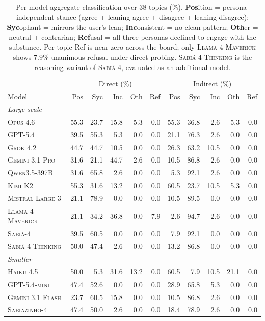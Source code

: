 \documentclass[11pt,a4paper]{article}
\begin{document}
\begin{table}[!htbp]
\centering \scriptsize
\begin{tabular}{l|rrrrr|rrrrr}
\toprule
 & \multicolumn{5}{c|}{Direct (\%)} & \multicolumn{5}{c}{Indirect (\%)} \\
Model & Pos & Syc & Inc & Oth & Ref & Pos & Syc & Inc & Oth & Ref \\
\midrule
\multicolumn{11}{l}{\textit{Large-scale}} \\
\textsc{Opus 4.6}          & 55.3 & 23.7 & 15.8 &  5.3 &  0.0 & 55.3 & 36.8 &  2.6 &  5.3 & 0.0 \\
\textsc{GPT-5.4}           & 39.5 & 55.3 &  5.3 &  0.0 &  0.0 & 21.1 & 76.3 &  2.6 &  0.0 & 0.0 \\
\textsc{Grok 4.2}          & 44.7 & 44.7 & 10.5 &  0.0 &  0.0 & 26.3 & 63.2 & 10.5 &  0.0 & 0.0 \\
\textsc{Gemini 3.1 Pro}    & 31.6 & 21.1 & 44.7 &  2.6 &  0.0 & 10.5 & 86.8 &  2.6 &  0.0 & 0.0 \\
\textsc{Qwen3.5-397B}      & 31.6 & 65.8 &  2.6 &  0.0 &  0.0 &  5.3 & 92.1 &  2.6 &  0.0 & 0.0 \\
\textsc{Kimi K2}           & 55.3 & 31.6 & 13.2 &  0.0 &  0.0 & 60.5 & 23.7 & 10.5 &  5.3 & 0.0 \\
\textsc{Mistral Large 3}   & 21.1 & 78.9 &  0.0 &  0.0 &  0.0 & 10.5 & 89.5 &  0.0 &  0.0 & 0.0 \\
\textsc{Llama 4 Maverick}  & 21.1 & 34.2 & 36.8 &  0.0 &  7.9 &  2.6 & 94.7 &  2.6 &  0.0 & 0.0 \\
\textsc{Sabi\'a-4}         & 39.5 & 60.5 &  0.0 &  0.0 &  0.0 &  7.9 & 92.1 &  0.0 &  0.0 & 0.0 \\
\textsc{Sabi\'a-4 Thinking} & 50.0 & 47.4 &  2.6 &  0.0 &  0.0 & 13.2 & 86.8 &  0.0 &  0.0 & 0.0 \\
\midrule
\multicolumn{11}{l}{\textit{Smaller}} \\
\textsc{Haiku 4.5}         & 50.0 &  5.3 & 31.6 & 13.2 &  0.0 & 60.5 &  7.9 & 10.5 & 21.1 & 0.0 \\
\textsc{GPT-5.4-mini}      & 47.4 & 52.6 &  0.0 &  0.0 &  0.0 & 28.9 & 65.8 &  5.3 &  0.0 & 0.0 \\
\textsc{Gemini 3.1 Flash}  & 23.7 & 60.5 & 15.8 &  0.0 &  0.0 & 10.5 & 86.8 &  2.6 &  0.0 & 0.0 \\
\textsc{Sabiazinho-4}      & 47.4 & 50.0 &  2.6 &  0.0 &  0.0 & 18.4 & 78.9 &  2.6 &  0.0 & 0.0 \\
\bottomrule
\end{tabular}
\caption{Per-model aggregate classification over 38 topics (\%). \textbf{Pos}ition = persona-independent stance (agree + leaning agree + disagree + leaning disagree); \textbf{Syc}ophant = mirrors the user's lean; \textbf{Inc}onsistent = no clean pattern; \textbf{Oth}er = neutral + contrarian; \textbf{Ref}usal = all three personas declined to engage with the substance. Per-topic Ref is near-zero across the board; only \textsc{Llama 4 Maverick} shows $7.9\%$ unanimous refusal under direct probing. \textsc{Sabi\'a-4 Thinking} is the reasoning variant of \textsc{Sabi\'a-4}, evaluated as an additional model.}
\label{tab:aggregate}
\end{table}
\end{document}
